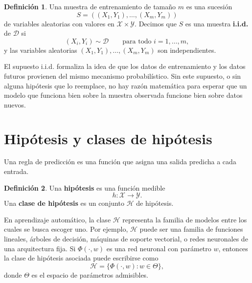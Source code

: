 \documentclass[11pt]{report}
\newenvironment{tcolorbox}[1][]{\par\medskip\noindent\ignorespaces}{\par\medskip}
\theoremstyle{definition}
\newtheorem{definicion}{Definición}[section]
\theoremstyle{plain}
\numberwithin{equation}{section}
\begin{document}
\begin{tcolorbox}[colback=blue!8, colframe=blue!8, boxrule=0pt]
\begin{definicion}
Una muestra de entrenamiento de tamaño \(m\) es una sucesión
\begin{equation*}
    S=((X_1,Y_1),\ldots,(X_m,Y_m))
\end{equation*}
de variables aleatorias con valores en \(\mathcal{X}\times\mathcal{Y}\). Decimos que \(S\) es una muestra \textbf{i.i.d.} de \(\mathcal{D}\) si
\begin{equation*}
    (X_i,Y_i)\sim\mathcal{D}
    \qquad
    \text{para todo } i=1,\ldots,m,
\end{equation*}
y las variables aleatorias \((X_1,Y_1),\ldots,(X_m,Y_m)\) son independientes.
\end{definicion}
\end{tcolorbox}

El supuesto i.i.d. formaliza la idea de que los datos de entrenamiento y los datos futuros provienen del mismo mecanismo probabilístico. Sin este supuesto, o sin alguna hipótesis que lo reemplace, no hay razón matemática para esperar que un modelo que funciona bien sobre la muestra observada funcione bien sobre datos nuevos.

\section{Hipótesis y clases de hipótesis}

Una regla de predicción es una función que asigna una salida predicha a cada entrada.

\begin{tcolorbox}[colback=blue!8, colframe=blue!8, boxrule=0pt]
\begin{definicion}
Una \textbf{hipótesis} es una función medible
\begin{equation*}
    h:\mathcal{X}\to\mathcal{Y}.
\end{equation*}
Una \textbf{clase de hipótesis} es un conjunto \(\mathcal{H}\) de hipótesis.
\end{definicion}
\end{tcolorbox}

En aprendizaje automático, la clase \(\mathcal{H}\) representa la familia de modelos entre los cuales se busca escoger uno. Por ejemplo, \(\mathcal{H}\) puede ser una familia de funciones lineales, árboles de decisión, máquinas de soporte vectorial, o redes neuronales de una arquitectura fija. Si \(\Phi(\cdot,w)\) es una red neuronal con parámetro \(w\), entonces la clase de hipótesis asociada puede escribirse como
\begin{equation*}
    \mathcal{H}
    =
    \{\Phi(\cdot,w): w\in\Theta\},
\end{equation*}
donde \(\Theta\) es el espacio de parámetros admisibles.
\end{document}
